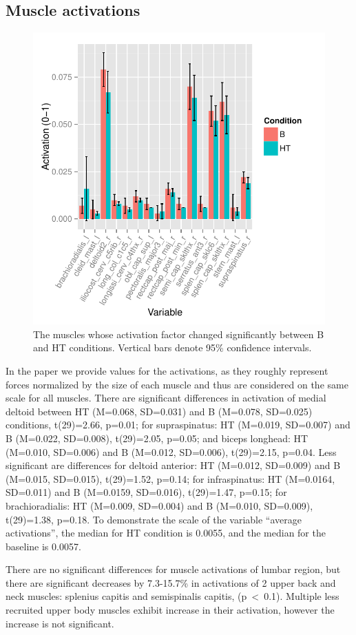 \subsection{Muscle activations}

\begin{figure}[tb]
\centering%
\includegraphics[width=\columnwidth]{img/Activations}%
\caption{
The muscles whose activation factor changed significantly between B and HT conditions. Vertical bars denote 95\% confidence intervals.}%
\label{fig:activations}
\end{figure}

 In the paper we provide values for the activations, as they roughly represent forces normalized by the size of each muscle and thus are considered on the same scale for all muscles. There are significant differences in activation of medial deltoid between HT (M=0.068, SD=0.031) and B (M=0.078, SD=0.025) conditions, t(29)=2.66, p=0.01; for supraspinatus: HT (M=0.019, SD=0.007) and B (M=0.022, SD=0.008), t(29)=2.05, p=0.05; and biceps longhead: HT (M=0.010, SD=0.006) and B (M=0.012, SD=0.006), t(29)=2.15, p=0.04. Less significant are differences for deltoid anterior: HT (M=0.012, SD=0.009) and B (M=0.015, SD=0.015), t(29)=1.52, p=0.14; for infraspinatus: HT (M=0.0164, SD=0.011) and B (M=0.0159, SD=0.016), t(29)=1.47, p=0.15; for brachioradialis: HT (M=0.009, SD=0.004) and B (M=0.010, SD=0.009), t(29)=1.38, p=0.18. To demonstrate the scale of the variable ``average activations'', the median for HT condition is 0.0055, and the median for the baseline is 0.0057.

There are no significant differences for muscle activations of lumbar region, but there are significant decreases by 7.3-15.7\% in activations of 2 upper back and neck muscles: splenius capitis and semispinalis capitis, (p~\textless~0.1). Multiple less recruited upper body muscles exhibit increase in their activation, however the increase is not significant.

